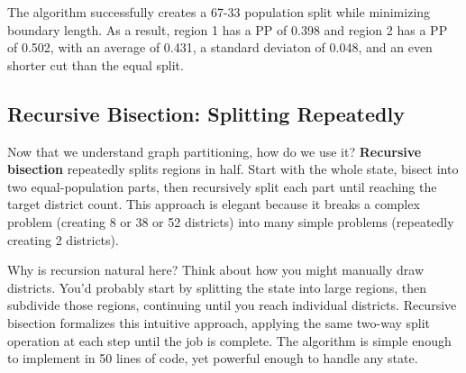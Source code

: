 \documentclass[11pt]{article}
\begin{document}
The algorithm successfully creates a 67-33 population split while minimizing boundary length. As a result, region 1 has a PP of 0.398 and region 2 has a PP of 0.502, with an average of 0.431, a standard deviaton of 0.048, and an even shorter cut than the equal split.

\subsection{Recursive Bisection: Splitting Repeatedly}

Now that we understand graph partitioning, how do we use it? \textbf{Recursive bisection} repeatedly splits regions in half. Start with the whole state, bisect into two equal-population parts, then recursively split each part until reaching the target district count. This approach is elegant because it breaks a complex problem (creating 8 or 38 or 52 districts) into many simple problems (repeatedly creating 2 districts).

Why is recursion natural here? Think about how you might manually draw districts. You'd probably start by splitting the state into large regions, then subdivide those regions, continuing until you reach individual districts. Recursive bisection formalizes this intuitive approach, applying the same two-way split operation at each step until the job is complete. The algorithm is simple enough to implement in 50 lines of code, yet powerful enough to handle any state.

\vspace{0.5em}
\noindent{}
\end{document}
